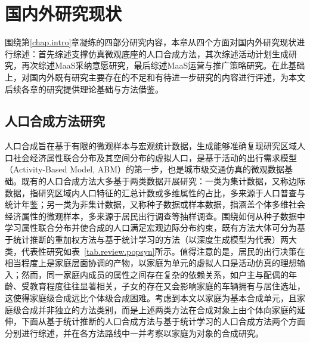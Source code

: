  \setlength{\baselineskip}{20pt}
\chapter{国内外研究现状}\label{chap.review}

围绕第\ref{chap.intro}章凝练的四部分研究内容，本章从四个方面对国内外研究现状进行综述：首先综述支撑仿真微观底座的人口合成方法，其次综述活动计划生成研究，再次综述MaaS采纳意愿研究，最后综述MaaS运营与推广策略研究。在此基础上，对国内外既有研究主要存在的不足和有待进一步研究的内容进行评述，为本文后续各章的研究提供理论基础与方法借鉴。

\section{人口合成方法研究}\label{sec.review.popsyn}

人口合成旨在基于有限的微观样本与宏观统计数据，生成能够准确复现研究区域人口社会经济属性联合分布及其空间分布的虚拟人口，是基于活动的出行需求模型（Activity-Based Model, ABM）的第一步，也是城市级交通仿真的微观数据基础\citep{beckmanCreatingSyntheticBaseline1996,mullerPopulationSynthesisMicrosimulation2010a,nguyenLargescaleActivitybasedDemand2025}。既有的人口合成方法大多基于两类数据开展研究：一类为集计数据，又称边际数据，指研究区域内人口特征的汇总计数或多维属性的占比，多来源于人口普查与统计年鉴；另一类为非集计数据，又称种子数据或样本数据，指涵盖个体多维社会经济属性的微观样本，多来源于居民出行调查等抽样调查\citep{laPopulationSynthesisProblembased2025}。围绕如何从种子数据中学习属性联合分布并使合成的人口满足宏观边际分布约束，既有方法大体可分为基于统计推断的重加权方法与基于统计学习的方法（以深度生成模型为代表）两大类\citep{laPopulationSynthesisProblembased2025}，代表性研究如表~\ref{tab.review.popsyn}所示。值得注意的是，居民的出行决策在相当程度上是家庭层面协调的产物，以家庭为单元的虚拟人口是活动仿真的理想输入\citep{laPopulationSynthesisProblembased2025}；然而，同一家庭内成员的属性之间存在复杂的依赖关系，如户主与配偶的年龄、受教育程度往往显著相关，子女的存在又会影响家庭的车辆拥有与居住选址\citep{sunHierarchicalMixtureModeling2018}，这使得家庭级合成远比个体级合成困难。考虑到本文以家庭为基本合成单元，且家庭级合成并非独立的方法类别，而是上述两类方法在合成对象上由个体向家庭的延伸，下面从基于统计推断的人口合成方法与基于统计学习的人口合成方法两个方面分别进行综述，并在各方法路线中一并考察以家庭为对象的合成研究。

